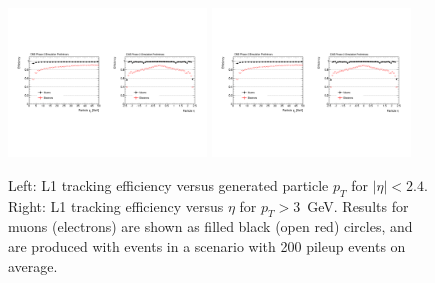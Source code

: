 \begin{figure}[h!tbp]
\begin{center}
  \includegraphics[width=0.47\textwidth]{figures/cmsupgrade/TDR-17-001_fig6_6_a.pdf} \hfill
  \includegraphics[width=0.47\textwidth]{figures/cmsupgrade/TDR-17-001_fig6_6_b.pdf}
  \caption{ Left: L1 tracking efficiency versus generated particle $p_T$ for $|\eta| < 2.4$.
	Right: L1 tracking efficiency versus $\eta$ for $p_T > 3$~GeV. Results for muons (electrons) are shown as filled black (open red) circles, and are produced with \ttbar events in a scenario with 200 pileup events on average. }
  \label{fig:cmsL1lepton}
\end{center}
\end{figure}

